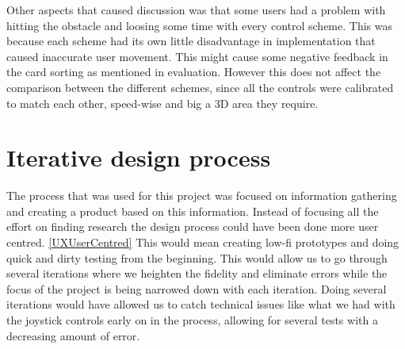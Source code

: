 Other aspects that caused discussion was that some users had a problem with hitting the obstacle and loosing some time with every control scheme. This was because each scheme had its own little disadvantage in implementation that caused inaccurate user movement. 
This might cause some negative feedback in the card sorting as mentioned in evaluation.  However this does not affect the comparison between the different schemes, since all the controls were calibrated to match each other, speed-wise and big a 3D area they require. 

\section*{Iterative design process}
The process that was used for this project was focused on information gathering and creating a product based on this information.
Instead of focusing all the effort on finding research the design process could have been done more user centred. \ref{UXUserCentred}
This would mean creating low-fi prototypes and doing quick and dirty testing from the beginning. This would allow us to go through several iterations where we heighten the fidelity and eliminate errors while the focus of the project is being narrowed down with each iteration. Doing several iterations would have allowed us to catch technical issues like what we had with the joystick controls early on in the process, allowing for several tests with a decreasing amount of error.
